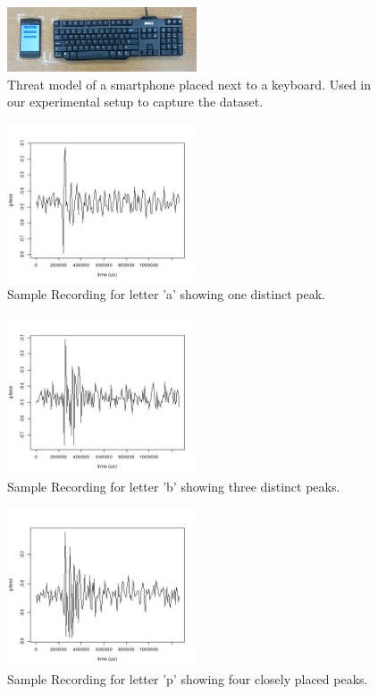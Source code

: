 \documentclass[11pt,conference]{IEEEtran}
\begin{document}
\pagebreak

\begin{figure}
\centering
\includegraphics[width=0.5\textwidth]{img/setup}
\caption{Threat model of a smartphone placed next to a keyboard. Used in our experimental setup to capture the dataset.
}
\label{fig:setup}
\end{figure}

\begin{figure}
\centering
\includegraphics[width=0.5\textwidth]{img/a_162}
\caption{Sample Recording for letter 'a' showing one distinct peak.}
\label{fig:signal-a}
\end{figure}

\begin{figure}
\centering
\includegraphics[width=0.5\textwidth]{img/b_147}
\caption{Sample Recording for letter 'b' showing three distinct peaks.}
\label{fig:signal-b}
\end{figure}

\begin{figure}
\centering
\includegraphics[width=0.5\textwidth]{img/p_566}
\caption{Sample Recording for letter 'p' showing four closely placed peaks.}
\label{fig:signal-p}
\end{figure}
\end{document}
